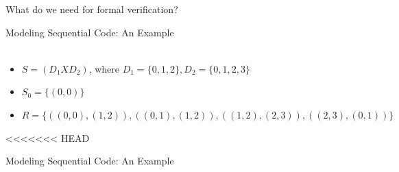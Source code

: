 \documentclass{beamer}
\begin{document}
\begin{frame}{What do we need for formal verification?}
\begin{frame}{Modeling Sequential Code: An Example}
\hfill
{} \\
 \\
\begin{itemize}
\item<3-> $S = (D_1 X D_2)$, where $D_1 = \{0,1,2\}, D_2 = \{0,1,2,3\}$
\item<3-> $S_0 = \{(0,0)\}$
\item<3-> $R = \{ ((0,0),(1,2)), ((0,1),(1,2)), ((1,2),(2,3)), ((2,3),(0,1))  \}$
\end{itemize}
\end{frame}

<<<<<<< HEAD
\begin{frame}{Modeling Sequential Code: An Example}
\hfill
{} \\
 \\


\end{frame}
\end{frame}
\end{document}
